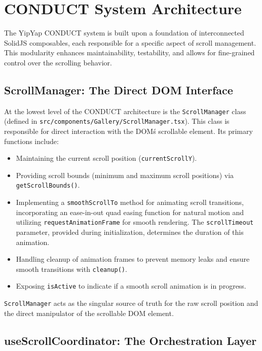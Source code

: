 \documentclass[10pt]{article}
\begin{document}
\section{CONDUCT System Architecture}

The YipYap CONDUCT system is built upon a foundation of interconnected SolidJS composables, each responsible for a specific aspect of scroll management. This modularity enhances maintainability, testability, and allows for fine-grained control over the scrolling behavior.

\subsection{ScrollManager: The Direct DOM Interface}

At the lowest level of the CONDUCT architecture is the \texttt{ScrollManager} 
class (defined in \linebreak[4] \texttt{src/components/Gallery/ScrollManager.tsx}). 
This class is responsible for direct interaction with the DOM\'s scrollable element. 
Its primary functions include:
\begin{itemize}
    \item Maintaining the current scroll position (\texttt{currentScrollY}).
    \item Providing scroll bounds (minimum and maximum scroll positions) via \texttt{getScrollBounds()}.
    \item Implementing a \texttt{smoothScrollTo} method for animating scroll transitions, incorporating an ease-in-out quad easing function for natural motion and utilizing \texttt{requestAnimationFrame} for smooth rendering. The \texttt{scrollTimeout} parameter, provided during initialization, determines the duration of this animation.
    \item Handling cleanup of animation frames to prevent memory leaks and ensure smooth transitions with \texttt{cleanup()}.
    \item Exposing \texttt{isActive} to indicate if a smooth scroll animation is in progress.
\end{itemize}
\texttt{ScrollManager} acts as the singular source of truth for the raw scroll position and the direct manipulator of the scrollable DOM element.

\subsection{useScrollCoordinator: The Orchestration Layer}
\end{document}
